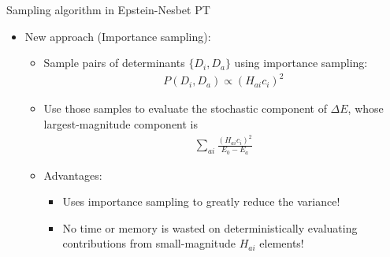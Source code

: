 \documentclass[amsmath]{beamer}
\begin{document}
\begin{frame}{Sampling algorithm in Epstein-Nesbet PT}
	\begin{itemize}
		\item New approach (Importance sampling):
		\linebreak
		\begin{itemize}
			\item Sample pairs of determinants $\{D_i, D_a\}$ %
			using importance sampling: \begin{eqnarray} P(D_i, D_a) \propto \left(H_{ai} c_i\right)^2 \end{eqnarray}
			\item Use those samples to evaluate the stochastic component of $\Delta E$,%
			whose largest-magnitude component is
			\begin{eqnarray}
				\sum_{ai %
				}\frac{ \left(H_{ai}c_i\right)^2}{E_0 - E_a}
			\end{eqnarray}
			\item Advantages:
			\begin{itemize}
				\item Uses importance sampling to greatly reduce the variance!
				\item No time or memory is wasted on deterministically evaluating contributions from small-magnitude $H_{ai}$ elements!
			\end{itemize}
		\end{itemize}
	\end{itemize}
\end{frame}
\end{document}
